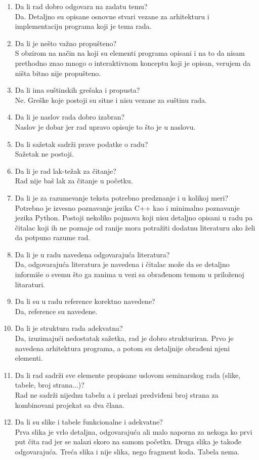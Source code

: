 \documentclass[a4paper]{report}
\begin{document}
\begin{enumerate}
\item Da li rad dobro odgovara na zadatu temu?\\
Da. Detaljno su opisane osnovne stvari vezane za arhitekturu i implementaciju programa koji je tema rada.
\item Da li je nešto važno propušteno?\\
S obzirom na način na koji su elementi programa opisani i na to da nisam prethodno znao mnogo o interaktivnom konceptu koji je opisan, verujem da ništa bitno nije propušteno.
\item Da li ima suštinskih grešaka i propusta?\\
Ne. Greške koje postoji su sitne i nisu vezane za suštinu rada.
\item Da li je naslov rada dobro izabran?\\
Naslov je dobar jer rad upravo opisuje to što je u naslovu.
\item Da li sažetak sadrži prave podatke o radu?\\
Sažetak ne postoji.
\item Da li je rad lak-težak za čitanje?\\
Rad nije baš lak za čitanje u početku.
\item Da li je za razumevanje teksta potrebno predznanje i u kolikoj meri?\\
Potrebno je izvesno poznavanje jezika C++ kao i minimalno poznavanje jezika Python. Postoji nekoliko pojmova koji nisu detaljno opisani u radu pa čitalac koji ih ne poznaje od ranije mora potražiti dodatnu literaturu ako želi da potpuno razume rad.
\item Da li je u radu navedena odgovarajuća literatura?\\
Da, odgovarajuća literatura je navedena i čitalac može da se detaljno informiše o svemu što ga zanima u vezi sa obrađenom temom u priloženoj litaraturi.
\item Da li su u radu reference korektno navedene?\\
Da, reference su navedene.
\item Da li je struktura rada adekvatna?\\
Da, izuzimajući nedostatak sažetka, rad je dobro strukturiran. Prvo je navedena arhitektura programa, a potom su detaljnije obrađeni njeni elementi.
\item Da li rad sadrži sve elemente propisane uslovom seminarskog rada (slike, tabele, broj strana...)?\\
Rad ne sadrži nijednu tabelu a i prelazi predviđeni broj strana za kombinovani projekat sa dva člana.
\item Da li su slike i tabele funkcionalne i adekvatne?\\
Prva slika je vrlo detaljna, odgovarajuća ali malo naporna za nekoga ko prvi put čita rad jer se nalazi skoro na samom početku. Druga slika je takođe odgovarajuća. Treća slika i nije slika, nego fragment koda. Tabela nema.
\end{enumerate}
\end{document}

